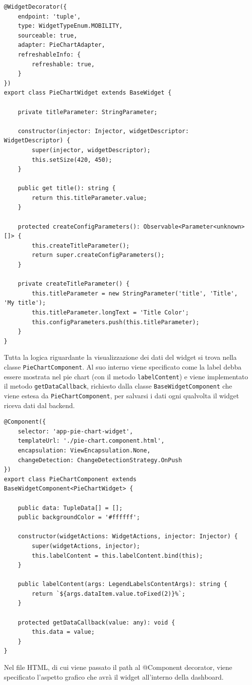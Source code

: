 \begin{lstlisting}[caption={Classe PieChartWidget}, style=javaScriptCode]
@WidgetDecorator({
    endpoint: 'tuple',
    type: WidgetTypeEnum.MOBILITY,
    sourceable: true,
    adapter: PieChartAdapter,
    refreshableInfo: {
        refreshable: true,
    }
})
export class PieChartWidget extends BaseWidget {

    private titleParameter: StringParameter;

    constructor(injector: Injector, widgetDescriptor: WidgetDescriptor) {
        super(injector, widgetDescriptor);
        this.setSize(420, 450);
    }

    public get title(): string {
        return this.titleParameter.value;
    }

    protected createConfigParameters(): Observable<Parameter<unknown>[]> {
        this.createTitleParameter();
        return super.createConfigParameters();
    }

    private createTitleParameter() {
        this.titleParameter = new StringParameter('title', 'Title', 'My title');
        this.titleParameter.longText = 'Title Color';
        this.configParameters.push(this.titleParameter);
    }
}

\end{lstlisting}
Tutta la logica riguardante la visualizzazione dei dati del widget si trova nella classe \verb|PieChartComponent|. Al suo interno viene specificato come la label debba essere mostrata nel pie chart (con il metodo \verb|labelContent|) e viene implementato il metodo \verb|getDataCallback|, richiesto dalla classe \verb|BaseWidgetComponent| che viene estesa da \verb|PieChartComponent|, per salvarsi i dati ogni qualvolta il widget riceva dati dal backend.

\begin{lstlisting}[caption={Classe PieChartComponent}, style=javaScriptCode]
@Component({
    selector: 'app-pie-chart-widget',
    templateUrl: './pie-chart.component.html',
    encapsulation: ViewEncapsulation.None,
    changeDetection: ChangeDetectionStrategy.OnPush
})
export class PieChartComponent extends BaseWidgetComponent<PieChartWidget> {

    public data: TupleData[] = [];
    public backgroundColor = '#ffffff';

    constructor(widgetActions: WidgetActions, injector: Injector) {
        super(widgetActions, injector);
        this.labelContent = this.labelContent.bind(this);
    }

    public labelContent(args: LegendLabelsContentArgs): string {
        return `${args.dataItem.value.toFixed(2)}%`;
    }

    protected getDataCallback(value: any): void {
        this.data = value;
    }
}
\end{lstlisting}
Nel file HTML, di cui viene passato il path al @Component decorator, viene specificato l'aspetto grafico che avrà il widget all'interno della dashboard.

